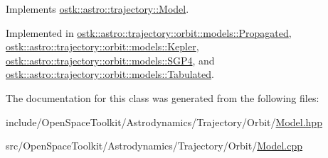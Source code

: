 Implements \hyperlink{classostk_1_1astro_1_1trajectory_1_1_model_a4b2098483430a820481ed50b81656e31}{ostk\+::astro\+::trajectory\+::\+Model}.



Implemented in \hyperlink{classostk_1_1astro_1_1trajectory_1_1orbit_1_1models_1_1_propagated_a2b8aa6ff5511dbe92e6a3e7f4dd6880b}{ostk\+::astro\+::trajectory\+::orbit\+::models\+::\+Propagated}, \hyperlink{classostk_1_1astro_1_1trajectory_1_1orbit_1_1models_1_1_kepler_a9c71803234f356ade03453e3ae19ae94}{ostk\+::astro\+::trajectory\+::orbit\+::models\+::\+Kepler}, \hyperlink{classostk_1_1astro_1_1trajectory_1_1orbit_1_1models_1_1_s_g_p4_a12416476201382c3d1e3c620f7be106a}{ostk\+::astro\+::trajectory\+::orbit\+::models\+::\+S\+G\+P4}, and \hyperlink{classostk_1_1astro_1_1trajectory_1_1orbit_1_1models_1_1_tabulated_a66be3f1f23a464c666c38a3adcc3bab5}{ostk\+::astro\+::trajectory\+::orbit\+::models\+::\+Tabulated}.



The documentation for this class was generated from the following files\+:\begin{DoxyCompactItemize}
\item 
include/\+Open\+Space\+Toolkit/\+Astrodynamics/\+Trajectory/\+Orbit/\hyperlink{_orbit_2_model_8hpp}{Model.\+hpp}\item 
src/\+Open\+Space\+Toolkit/\+Astrodynamics/\+Trajectory/\+Orbit/\hyperlink{_orbit_2_model_8cpp}{Model.\+cpp}\end{DoxyCompactItemize}
